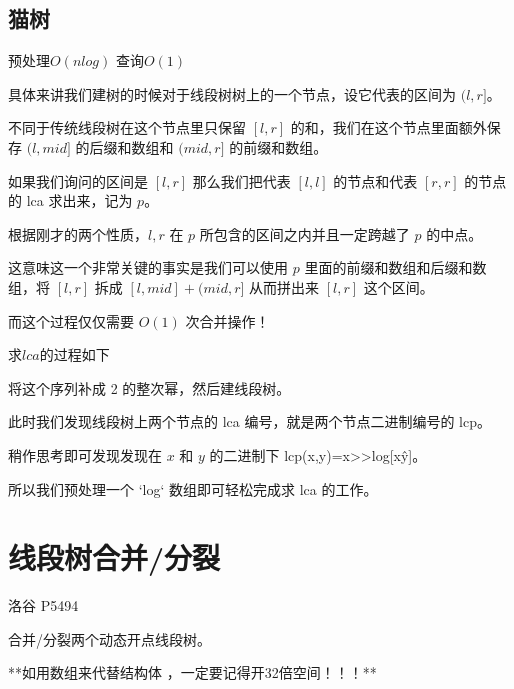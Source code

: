 \documentclass[12pt]{article}
\begin{document}
{{{{{{{{{\subsection{猫树}

预处理$O(nlog)$ 查询$O(1)$

具体来讲我们建树的时候对于线段树树上的一个节点，设它代表的区间为 $(l,r]$。

不同于传统线段树在这个节点里只保留 $[l,r]$ 的和，我们在这个节点里面额外保存 $(l,mid]$ 的后缀和数组和 $(mid,r]$ 的前缀和数组。

如果我们询问的区间是 $[l,r]$ 那么我们把代表 $[l,l]$ 的节点和代表 $[r,r]$ 的节点的 lca 求出来，记为 $p$。

根据刚才的两个性质，$l,r$ 在 $p$ 所包含的区间之内并且一定跨越了 $p$ 的中点。

这意味这一个非常关键的事实是我们可以使用 $p$ 里面的前缀和数组和后缀和数组，将 $[l,r]$ 拆成 $[l,mid]+(mid,r]$ 从而拼出来 $[l,r]$ 这个区间。

而这个过程仅仅需要 $O(1)$ 次合并操作！

求$lca$的过程如下

将这个序列补成 2 的整次幂，然后建线段树。

此时我们发现线段树上两个节点的 lca 编号，就是两个节点二进制编号的 lcp。

稍作思考即可发现发现在 $x$ 和 $y$ 的二进制下 lcp(x,y)=x>>log[x\^y]。

所以我们预处理一个 `log` 数组即可轻松完成求 lca 的工作。

\section{线段树合并/分裂}

洛谷 P5494

合并/分裂两个动态开点线段树。

**如用数组来代替结构体 ，一定要记得开32倍空间！！！**

}}}}}}}}}
\end{document}

